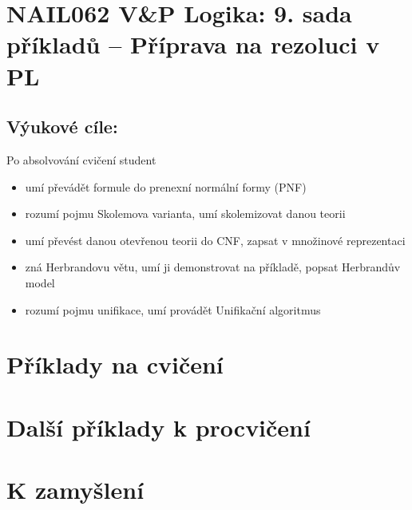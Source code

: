 \section*{NAIL062 V\&P Logika: 9. sada příkladů -- Příprava na rezoluci v PL}


\subsection*{Výukové cíle:} Po absolvování cvičení student

    \begin{itemize}\setlength{\itemsep}{0pt}
        \item umí převádět formule do prenexní normální formy (PNF)
        \item rozumí pojmu Skolemova varianta, umí skolemizovat danou teorii
        \item umí převést danou otevřenou teorii do CNF, zapsat v množinové reprezentaci
        \item zná Herbrandovu větu, umí ji demonstrovat na příkladě, popsat Herbrandův model
        \item rozumí pojmu unifikace, umí provádět Unifikační algoritmus
    \end{itemize}
    

\section*{Příklady na cvičení}


\begin{problem}


    \begin{solution}
                    
    \end{solution}

\end{problem}

        
        
\section*{Další příklady k procvičení}

        
\section*{K zamyšlení}


